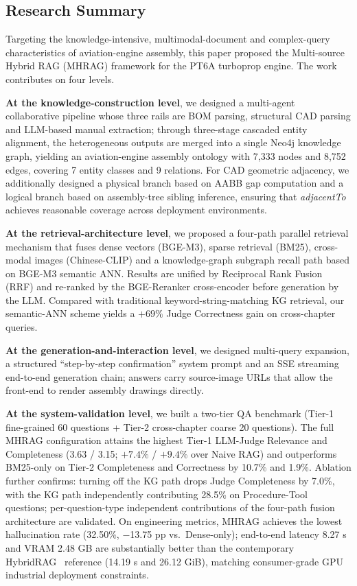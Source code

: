 \documentclass[applsci,article,submit,pdftex,moreauthors]{Definitions/mdpi}
\begin{document}
\subsection{Research Summary}

Targeting the knowledge-intensive, multimodal-document and complex-query characteristics of aviation-engine assembly, this paper proposed the Multi-source Hybrid RAG (MHRAG) framework for the PT6A turboprop engine. The work contributes on four levels.

\textbf{At the knowledge-construction level}, we designed a multi-agent collaborative pipeline whose three rails are BOM parsing, structural CAD parsing and LLM-based manual extraction; through three-stage cascaded entity alignment, the heterogeneous outputs are merged into a single Neo4j knowledge graph, yielding an aviation-engine assembly ontology with 7{,}333 nodes and 8{,}752 edges, covering 7 entity classes and 9 relations. For CAD geometric adjacency, we additionally designed a physical branch based on AABB gap computation and a logical branch based on assembly-tree sibling inference, ensuring that \textit{adjacentTo} achieves reasonable coverage across deployment environments.

\textbf{At the retrieval-architecture level}, we proposed a four-path parallel retrieval mechanism that fuses dense vectors (BGE-M3), sparse retrieval (BM25), cross-modal images (Chinese-CLIP) and a knowledge-graph subgraph recall path based on BGE-M3 semantic ANN. Results are unified by Reciprocal Rank Fusion (RRF) and re-ranked by the BGE-Reranker cross-encoder before generation by the LLM. Compared with traditional keyword-string-matching KG retrieval, our semantic-ANN scheme yields a $+69\%$ Judge Correctness gain on cross-chapter queries.

\textbf{At the generation-and-interaction level}, we designed multi-query expansion, a structured ``step-by-step confirmation'' system prompt and an SSE streaming end-to-end generation chain; answers carry source-image URLs that allow the front-end to render assembly drawings directly.

\textbf{At the system-validation level}, we built a two-tier QA benchmark (Tier-1 fine-grained 60 questions + Tier-2 cross-chapter coarse 20 questions). The full MHRAG configuration attains the highest Tier-1 LLM-Judge Relevance and Completeness (3.63 / 3.15; ${+}7.4\%$ / ${+}9.4\%$ over Naive RAG) and outperforms BM25-only on Tier-2 Completeness and Correctness by 10.7\% and 1.9\%. Ablation further confirms: turning off the KG path drops Judge Completeness by 7.0\%, with the KG path independently contributing 28.5\% on Procedure-Tool questions; per-question-type independent contributions of the four-path fusion architecture are validated. On engineering metrics, MHRAG achieves the lowest hallucination rate (32.50\%, $-$13.75 pp vs.\ Dense-only); end-to-end latency 8.27 s and VRAM 2.48 GB are substantially better than the contemporary HybridRAG~\citep{shen2025hybridrag} reference (14.19 s and 26.12 GiB), matching consumer-grade GPU industrial deployment constraints.
\end{document}
